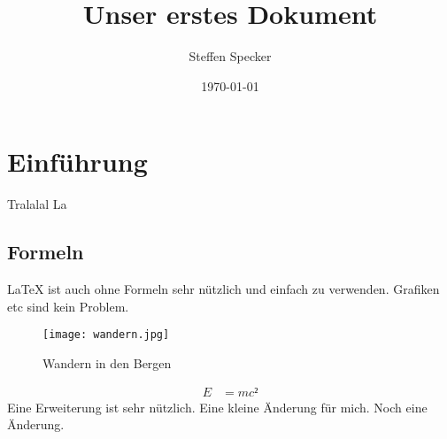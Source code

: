 \documentclass[12pt,a4paper]{article}
\author{Steffen Specker}
\title{Unser erstes Dokument}
\date{\today}
\begin{document}
\maketitle
\tableofcontents

\newpage

\section{Einführung}

Tralalal La



\subsection{Formeln}

\LaTeX{} ist auch ohne Formeln sehr nützlich und einfach zu verwenden. Grafiken etc sind kein Problem.


\begin{figure}[h]
\begin{center}
\texttt{[image: wandern.jpg]}
\caption{Wandern in den Bergen}
\label{wandern.pgtest}

\end{center}
\end{figure}


\begin{align*}
E &= mc²
\end{align*}
Eine Erweiterung ist sehr nützlich.
Eine kleine Änderung für mich.
Noch eine Änderung.
\end{document}

